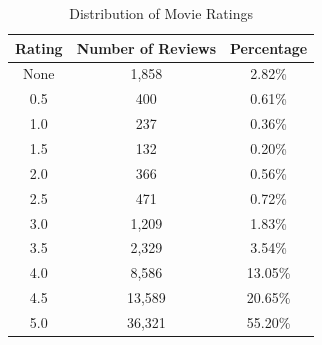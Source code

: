 \documentclass[11pt]{article}
\begin{document}
\begin{table}[h]
    	\centering
    	\begin{tabular}{c c c}
        		\toprule
        		\textbf{Rating} & \textbf{Number of Reviews} & \textbf{Percentage} \\
        		\midrule
        		None & 1,858 & 2.82\% \\
        		0.5 & 400 & 0.61\% \\
        		1.0 & 237 & 0.36\% \\
        		1.5 & 132 & 0.20\% \\
        		2.0 & 366 & 0.56\% \\
        		2.5 & 471 & 0.72\% \\
        		3.0 & 1,209 & 1.83\% \\
        		3.5 & 2,329 & 3.54\% \\
        		4.0 & 8,586 & 13.05\% \\
        		4.5 & 13,589 & 20.65\% \\
        		5.0 & 36,321 & 55.20\% \\
        		\bottomrule
    	\end{tabular}
    	\caption{Distribution of Movie Ratings}
    	\label{tab:review_rating_distribution}
\end{table}
\end{document}
